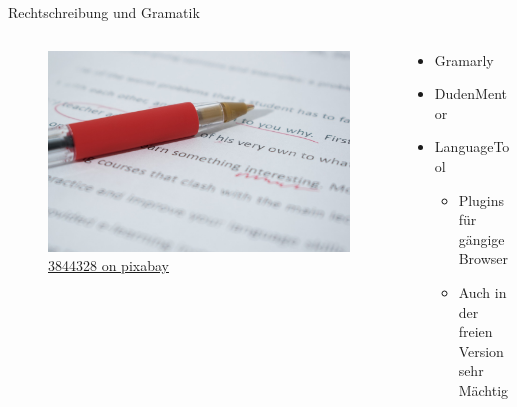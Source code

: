 \begin{frame}{Rechtschreibung und Gramatik}
    \begin{columns}[t]
        \begin{column}{0.4\textwidth}
            \vspace{-2em} 
            \begin{figure}
                \begin{flushleft}
                    \includegraphics[height=0.6\textheight,trim={8cm 10 2cm 0},clip]{graphics/correcting-1870721_1280.jpg}
                    \caption*{\href{https://pixabay.com/photos/correcting-proof-paper-correction-1870721/}{3844328 on pixabay}}    
                \end{flushleft}                
            \end{figure}
            
        \end{column}
        \begin{column}{0.6\textwidth}
            \begin{itemize}
                \item Gramarly
                \item DudenMentor
                \item LanguageTool
                \begin{itemize}
                    \item Plugins für gängige Browser
                    \item Auch in der freien Version sehr Mächtig
                \end{itemize}
            \end{itemize}
        \end{column}
    \end{columns}
\end{frame}

